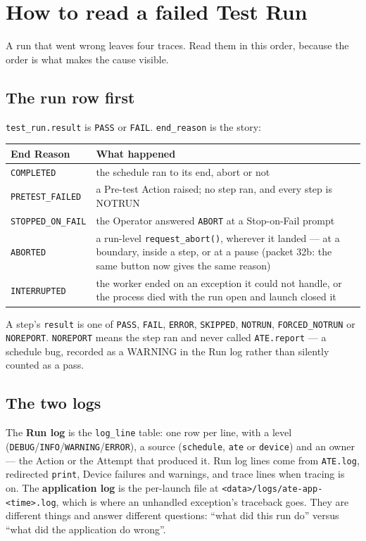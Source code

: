 \chapter{How to read a failed Test Run}\label{ch:failed-run}

A run that went wrong leaves four traces. Read them in this order, because the order is what makes the
cause visible.

\section{The run row first}

\texttt{test\_run.result} is \texttt{PASS} or \texttt{FAIL}. \texttt{end\_reason} is the story:

\begingroup\small
\begin{longtable}{p{3.2cm} p{9.4cm}}
\toprule
\textbf{End Reason} & \textbf{What happened} \\
\midrule
\endhead
\texttt{COMPLETED} & the schedule ran to its end, abort or not \\
\texttt{PRETEST\_FAILED} & a Pre-test Action raised; no step ran, and every step is NOTRUN \\
\texttt{STOPPED\_ON\_FAIL} & the Operator answered \texttt{ABORT} at a Stop-on-Fail prompt \\
\texttt{ABORTED} & a run-level \texttt{request\_abort()}, wherever it landed --- at a boundary, inside a
  step, or at a pause (packet 32b: the same button now gives the same reason) \\
\texttt{INTERRUPTED} & the worker ended on an exception it could not handle, or the process died with the
  run open and launch closed it \\
\bottomrule
\end{longtable}
\endgroup

A step's \texttt{result} is one of \texttt{PASS}, \texttt{FAIL}, \texttt{ERROR}, \texttt{SKIPPED},
\texttt{NOTRUN}, \texttt{FORCED\_NOTRUN} or \texttt{NOREPORT}. \texttt{NOREPORT} means the step ran and never
called \texttt{ATE.report} --- a schedule bug, recorded as a WARNING in the Run log rather than silently
counted as a pass.

\section{The two logs}

The \textbf{Run log} is the \texttt{log\_line} table: one row per line, with a level
(\texttt{DEBUG}/\texttt{INFO}/\texttt{WARNING}/\texttt{ERROR}), a source (\texttt{schedule}, \texttt{ate} or
\texttt{device}) and an owner --- the Action or the Attempt that produced it. Run log lines come from
\texttt{ATE.log}, redirected \texttt{print}, Device failures and warnings, and trace lines when tracing is
on. The \textbf{application log} is the per-launch file at \texttt{<data>/\allowbreak{}logs/\allowbreak{}ate-app-<time>.log}, which
is where an unhandled exception's traceback goes. They are different things and answer different questions:
``what did this run do'' versus ``what did the application do wrong''.

